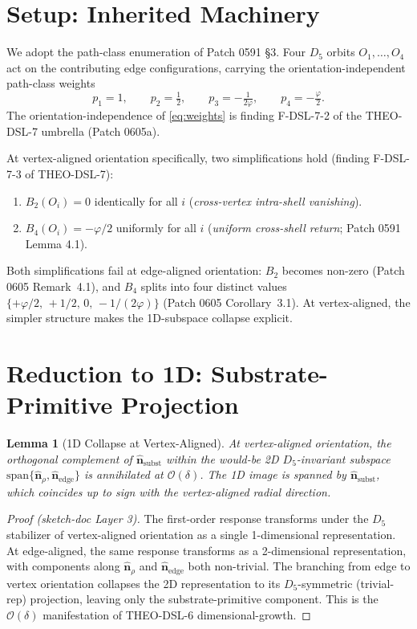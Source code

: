 \documentclass[11pt]{article}
\newtheorem{lemma}{Lemma}
\begin{document}
\section{Setup: Inherited Machinery}

We adopt the path-class enumeration of Patch 0591 §3. Four $D_5$ orbits
$O_1,\ldots,O_4$ act on the contributing edge configurations, carrying
the orientation-independent path-class weights
\begin{equation}
p_1 = 1, \qquad p_2 = \tfrac{1}{2}, \qquad
p_3 = -\tfrac{1}{2\varphi}, \qquad p_4 = -\tfrac{\varphi}{2}.
\label{eq:weights}
\end{equation}
The orientation-independence of \eqref{eq:weights} is finding F-DSL-7-2
of the THEO-DSL-7 umbrella (Patch 0605a).

\medskip
At vertex-aligned orientation specifically, two simplifications hold
(finding F-DSL-7-3 of THEO-DSL-7):
\begin{enumerate}
\item[(V.1)] $B_2(O_i) = 0$ identically for all $i$
(\emph{cross-vertex intra-shell vanishing}).
\item[(V.2)] $B_4(O_i) = -\varphi/2$ uniformly for all $i$
(\emph{uniform cross-shell return}; Patch 0591 Lemma 4.1).
\end{enumerate}
Both simplifications fail at edge-aligned orientation: $B_2$ becomes
non-zero (Patch 0605 Remark~4.1), and $B_4$ splits into four distinct
values $\{+\varphi/2,\,+1/2,\,0,\,-1/(2\varphi)\}$ (Patch 0605
Corollary~3.1). At vertex-aligned, the simpler structure
makes the 1D-subspace collapse explicit.

\section{Reduction to 1D: Substrate-Primitive Projection}

\begin{lemma}[1D Collapse at Vertex-Aligned]\label{lem:1Dcollapse}
At vertex-aligned orientation, the orthogonal complement of
$\hat{\mathbf{n}}_{\text{subst}}$ within the would-be 2D
$D_5$-invariant subspace
$\mathrm{span}\{\hat{\mathbf{n}}_\rho,\hat{\mathbf{n}}_{\text{edge}}\}$ is
annihilated at $\mathcal{O}(\delta)$. The 1D image is spanned by
$\hat{\mathbf{n}}_{\text{subst}}$, which coincides up to sign with the
vertex-aligned radial direction.
\end{lemma}

\begin{proof}[Proof (sketch-doc Layer 3)]
The first-order response transforms under the $D_5$ stabilizer of
vertex-aligned orientation as a single 1-dimensional representation.
At edge-aligned, the same response transforms as a 2-dimensional
representation, with components along $\hat{\mathbf{n}}_\rho$ and
$\hat{\mathbf{n}}_{\text{edge}}$ both non-trivial. The branching from
edge to vertex orientation collapses the 2D representation to its
$D_5$-symmetric (trivial-rep) projection, leaving only the
substrate-primitive component. This is the $\mathcal{O}(\delta)$
manifestation of THEO-DSL-6 dimensional-growth.
\end{proof}
\end{document}

